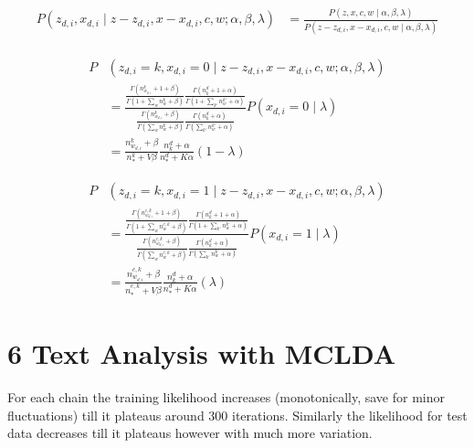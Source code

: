 \documentclass[12pt]{article}
\begin{document}
\begin{align}
P (z_{d,i}, x_{d,i} \mid z-z_{d,i},x-x_{d,i},c,w;\alpha, \beta, \lambda) &= \frac{P (z, x, c, w\mid \alpha, \beta, \lambda)}{P (z-z_{d,i}, x-x_{d,i}, c, w\mid \alpha, \beta, \lambda)} \nonumber\\
\end{align}

\begin{align}
P &(z_{d,i}=k, x_{d,i} = 0 \mid z-z_{d,i},x-x_{d,i},c,w;\alpha, \beta, \lambda)  \nonumber\\
&=\frac{\frac{\Gamma(n^{k}_{w_{d,i}} +1+\beta)}{\Gamma(1+\sum_{w} n^{k}_{w}+\beta)}  \frac{\Gamma(n^{d}_{k} +1+\alpha)}{\Gamma(1+\sum_{k'} n^{k'}_{w}+\alpha)}}{\frac{\Gamma(n^{k}_{w_{d,i}} +\beta)}{\Gamma(\sum_{w} n^{k}_{w}+\beta)}  \frac{\Gamma(n^{d}_{k} +\alpha)}{\Gamma(\sum_{k'} n^{k'}_{w}+\alpha)}} P(x_{d,i} = 0 \mid \lambda)\nonumber\\
&= \frac{n^{k}_{w_{d,i}}+\beta}{n^{k}_{*}+V\beta}  \frac{n^{d}_{k} +\alpha}{n^{d}_{*} +K\alpha} (1-\lambda) 
\end{align}

\begin{align}
P &(z_{d,i}=k, x_{d,i} = 1 \mid z-z_{d,i},x-x_{d,i},c,w;\alpha, \beta, \lambda)  \nonumber\\
&=\frac{\frac{\Gamma(n^{c,k}_{w_{d,i}} +1+\beta)}{\Gamma(1+\sum_{w} n^{c,k}_{w}+\beta)}  \frac{\Gamma(n^{d}_{k} +1+\alpha)}{\Gamma(1+\sum_{k'} n^{k'}_{w}+\alpha)}}{\frac{\Gamma(n^{c,k}_{w_{d,i}} +\beta)}{\Gamma(\sum_{w} n^{c,k}_{w}+\beta)}  \frac{\Gamma(n^{d}_{k} +\alpha)}{\Gamma(\sum_{k'} n^{k'}_{w}+\alpha)}} P(x_{d,i} = 1 \mid \lambda)\nonumber\\
&= \frac{n^{c,k}_{w_{d,i}}+\beta}{n^{c,k}_{*}+V\beta}  \frac{n^{d}_{k} +\alpha}{n^{d}_{*} +K\alpha} (\lambda) 
\end{align}


\section*{6 Text Analysis with MCLDA}
 For each chain the training likelihood increases (monotonically, save for minor fluctuations)  till it plateaus around 300 iterations. Similarly the likelihood for test data decreases till it plateaus however with much more variation. \\
\end{document}
